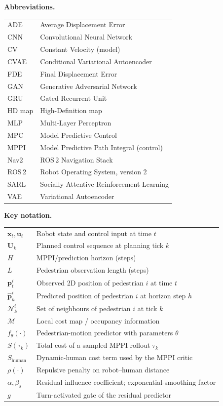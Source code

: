 \documentclass[12pt, a4paper]{article}
\begin{document}
\textbf{Abbreviations.}

\begin{tabular}{ll}
ADE & Average Displacement Error \\
CNN & Convolutional Neural Network \\
CV & Constant Velocity (model) \\
CVAE & Conditional Variational Autoencoder \\
FDE & Final Displacement Error \\
GAN & Generative Adversarial Network \\
GRU & Gated Recurrent Unit \\
HD map & High-Definition map \\
MLP & Multi-Layer Perceptron \\
MPC & Model Predictive Control \\
MPPI & Model Predictive Path Integral (control) \\
Nav2 & ROS\,2 Navigation Stack \\
ROS\,2 & Robot Operating System, version 2 \\
SARL & Socially Attentive Reinforcement Learning \\
VAE & Variational Autoencoder \\
\end{tabular}

\textbf{Key notation.}

\begin{tabular}{ll}
$\mathbf{x}_t,\mathbf{u}_t$ & Robot state and control input at time $t$ \\
$\mathbf{U}_k$ & Planned control sequence at planning tick $k$ \\
$H$ & MPPI/prediction horizon (steps) \\
$L$ & Pedestrian observation length (steps) \\
$\mathbf{p}^{i}_t$ & Observed 2D position of pedestrian $i$ at time $t$ \\
$\hat{\mathbf{p}}^{i}_h$ & Predicted position of pedestrian $i$ at horizon step $h$ \\
$\mathcal{N}^{i}_k$ & Set of neighbours of pedestrian $i$ at tick $k$ \\
$\mathcal{M}$ & Local cost map / occupancy information \\
$f_\theta(\cdot)$ & Pedestrian-motion predictor with parameters $\theta$ \\
$S(\tau_k)$ & Total cost of a sampled MPPI rollout $\tau_k$ \\
$S_{\mathrm{human}}$ & Dynamic-human cost term used by the MPPI critic \\
$\rho(\cdot)$ & Repulsive penalty on robot--human distance \\
$\alpha,\beta_s$ & Residual influence coefficient; exponential-smoothing factor \\
$g$ & Turn-activated gate of the residual predictor \\
\end{tabular}
\end{document}
